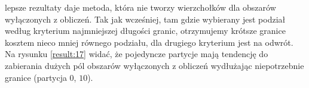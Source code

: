 lepsze rezultaty daje metoda, która nie tworzy wierzchołków dla obszarów wyłączonych z obliczeń.
Tak jak wcześniej, tam gdzie wybierany jest podział według kryterium najmniejszej długości granic, otrzymujemy krótsze
granice kosztem nieco mniej równego podziału, dla drugiego kryterium jest na odwrót.
Na rysunku \ref{result:17} widać, że pojedyncze partycje mają tendencję do zabierania dużych pól obszarów wyłączonych z obliczeń
wydłużając niepotrzebnie granice (partycja $0$, $10$).
\begin{figure}[h]
\centering
\begin{subfigure}{.33\textwidth}
    \centering
    \caption[short]{}
\end{subfigure}%
\begin{subfigure}{.33\textwidth}
    \centering

\end{subfigure}
\end{figure}
